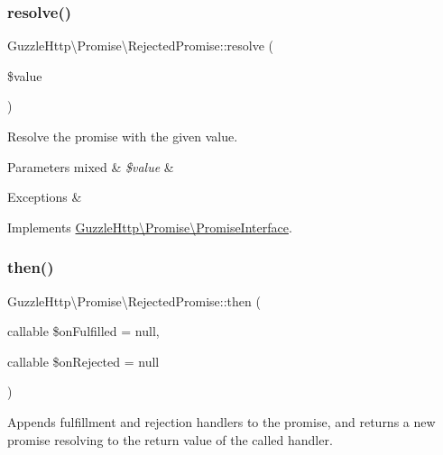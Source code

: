 \subsubsection{\texorpdfstring{resolve()}{resolve()}}
{\footnotesize\ttfamily Guzzle\+Http\textbackslash{}\+Promise\textbackslash{}\+Rejected\+Promise\+::resolve (\begin{DoxyParamCaption}\item[{}]{\$value }\end{DoxyParamCaption})}

Resolve the promise with the given value.


\begin{DoxyParams}[1]{Parameters}
mixed & {\em \$value} & \\
\hline
\end{DoxyParams}

\begin{DoxyExceptions}{Exceptions}
{\em } & \\
\hline
\end{DoxyExceptions}


Implements \hyperlink{interfaceGuzzleHttp_1_1Promise_1_1PromiseInterface_ae39a5f1a81903f74af5114c272bf7b7b}{Guzzle\+Http\textbackslash{}\+Promise\textbackslash{}\+Promise\+Interface}.

\mbox{\label{classGuzzleHttp_1_1Promise_1_1RejectedPromise_a2b91783cd3388e3aa66d0902c3cf4c49}} 
\subsubsection{\texorpdfstring{then()}{then()}}
{\footnotesize\ttfamily Guzzle\+Http\textbackslash{}\+Promise\textbackslash{}\+Rejected\+Promise\+::then (\begin{DoxyParamCaption}\item[{callable}]{\$on\+Fulfilled = {\ttfamily null},  }\item[{callable}]{\$on\+Rejected = {\ttfamily null} }\end{DoxyParamCaption})}

Appends fulfillment and rejection handlers to the promise, and returns a new promise resolving to the return value of the called handler.


